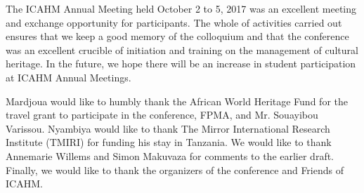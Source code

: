 
The ICAHM Annual Meeting held October 2 to 5, 2017 was an excellent meeting and exchange opportunity for participants. The whole of activities carried out ensures that we keep a good memory of the colloquium and that the conference was an excellent crucible of initiation and training on the management of cultural heritage. In the future, we hope there will be an increase in student participation at ICAHM Annual Meetings.


Mardjoua would like to humbly thank the African World Heritage Fund for the travel grant to participate in the conference, FPMA, and Mr. Souayibou Varissou. Nyambiya would like to thank The Mirror International Research Institute (TMIRI) for funding his stay in Tanzania. We would like to thank Annemarie Willems and Simon Makuvaza for comments to the earlier draft. Finally, we would like to thank the organizers of the conference and Friends of ICAHM.

\IJSRAclosing%
